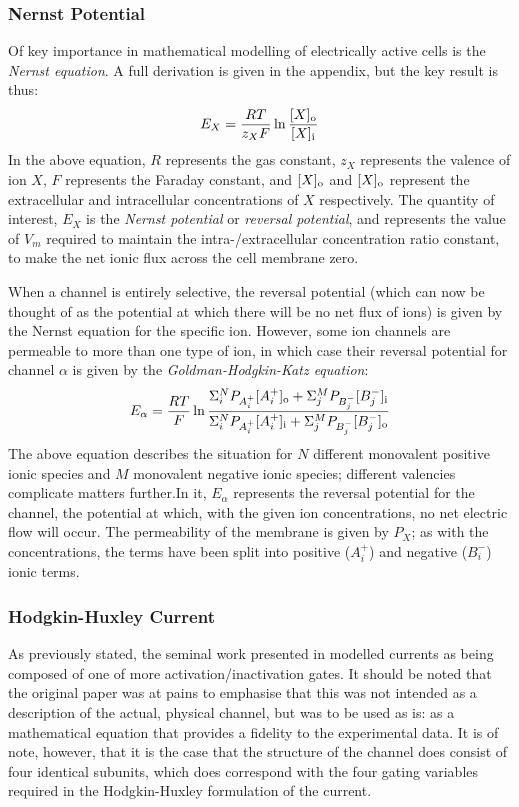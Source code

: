 \documentclass[../thesis-main.tex]{subfiles}
\begin{document}
\subsubsection{Nernst Potential}
\label{subsubsec:nernst}
Of key importance in mathematical modelling of electrically active cells is the \emph{Nernst equation}. A full derivation is given in the appendix, but the key result is thus:
\begin{equation}
 E_X = \frac{RT}{z_XF}\ln\frac{[X]_\textnormal{o}}{[X]_\textnormal{i}}
\end{equation}
In the above equation, $R$ represents the gas constant, $z_X$ represents the valence of ion $X$, $F$ represents the Faraday constant, and $[X]_\textnormal{o}$ and $[X]_\textnormal{o}$ represent the extracellular and intracellular concentrations of $X$ respectively. The quantity of interest, $E_X$ is the \emph{Nernst potential} or \emph{reversal potential}, and represents the value of $V_m$ required to maintain the intra-/extracellular concentration ratio constant, \idest{} to make the net ionic flux across the cell membrane zero.

When a channel is entirely selective, the reversal potential (which can now be thought of as the potential at which there will be no net flux of ions) is given by the Nernst equation for the specific ion. However, some ion channels are permeable to more than one type of ion, in which case their reversal potential for channel $\alpha$ is given by the \emph{Goldman-Hodgkin-Katz equation}:
\begin{equation}
 E_\alpha = \frac{RT}{F}\ln\frac{\Sigma_i^N P_{A_i^+}[A_i^+]_\textnormal{o} + \Sigma_j^M P_{B_j^-}[B_j^-]_\textnormal{i}}{\Sigma_i^N P_{A_i^+}[A_i^+]_\textnormal{i} + \Sigma_j^M P_{B_j^-}[B_j^-]_\textnormal{o}}
\end{equation}
The above equation describes the situation for $N$ different monovalent positive ionic species and $M$ monovalent negative ionic species; different valencies complicate matters further.In it, $E_\alpha$ represents the reversal potential for the channel, \idest{} the potential at which, with the given ion concentrations, no net electric flow will occur. The permeability of the membrane is given by $P_X$; as with the concentrations, the terms have been split into positive ($A_i^+$) and negative ($B_i^-$) ionic terms.

\subsubsection{Hodgkin-Huxley Current}
As previously stated, the seminal work presented in \citet{Hodgkin1952} modelled currents as being composed of one of more activation/inactivation gates. It should be noted that the original paper was at pains to emphasise that this was not intended as a description of the actual, physical channel, but was to be used as is: as a mathematical equation that provides a fidelity to the experimental data. It is of note, however, that it is the case that the structure of the \K{} channel does consist of four identical subunits, which does correspond with the four gating variables required in the Hodgkin-Huxley formulation of the current.
\end{document}
